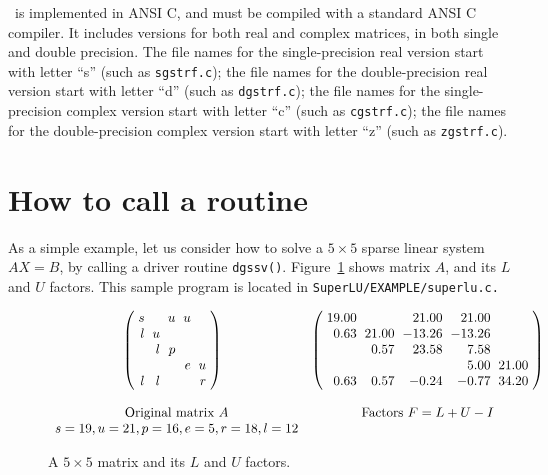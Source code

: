     \superlu\ is implemented in ANSI C, and must be compiled with a standard
ANSI C compiler. It includes versions for both real and complex
matrices, in both single and double precision. 
The file names for the 
single-precision real version start with letter ``s'' (such as {\tt sgstrf.c});
the file names for the double-precision real version start with letter ``d'' 
(such as {\tt dgstrf.c}); the file names for the single-precision complex
version start with letter ``c'' (such as {\tt cgstrf.c}); the file names
for the double-precision complex version start with letter ``z'' 
(such as {\tt zgstrf.c}).


\section{How to call a {\superlu} routine}
\label{sec:ex5x5}
As a simple example, let us consider how to solve
a $5\times 5$ sparse linear system $AX=B$, by calling a driver
routine {\tt dgssv()}. Figure~\ref{5x5} shows matrix $A$, and its $L$ and $U$
factors. This sample program is located in {\tt SuperLU/EXAMPLE/superlu.c.}

\begin{figure}[t]
  \newcommand{\s}{\space}
  \newcommand{\x}{\bullet}
  \newcommand{\f}{\circ}
  \begin{displaymath}
  \begin{array}{cc}
{\arraycolsep=3pt
\left(
\begin{array}{rrrrr}
s  	& \s 	& u 	& u 	& \s \\
l  	& u  	& \s 	& \s 	& \s \\
\s 	& l 	& p  	& \s 	& \s \\
\s 	& \s 	& \s 	& e  	& u \\
l 	& l 	& \s 	& \s 	& r 
\end{array}
\right)  }  \:\:\: &
{\arraycolsep=3pt
\left(
\begin{array}{rrrrr}
19.00  	& \s 	& 21.00 & 21.00	& \s \\
0.63 	& 21.00	& -13.26& -13.26& \s \\
\s 	& 0.57 	& 23.58	& 7.58 	& \s \\
\s 	& \s 	& \s 	& 5.00 	& 21.00 \\
0.63 	& 0.57 	& -0.24	& -0.77	& 34.20
\end{array}
\right)  }  \\ 
\: & \: \\
\mbox{Original matrix $A$} 	& \mbox{Factors $F=L+U-I$} \\
    s = 19, u = 21, p = 16, e = 5, r = 18, l = 12  & \\
  \end{array}
  \end{displaymath}
\vspace*{-0.2in}
\caption{A $5\times 5$ matrix and its $L$ and $U$ factors.}
\label{5x5}
\end{figure}

